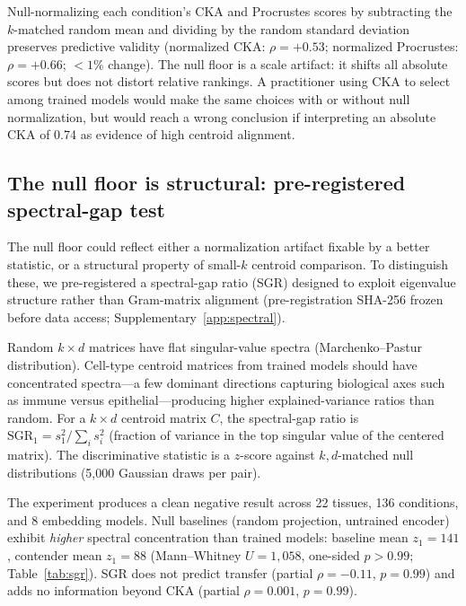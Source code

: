 \documentclass[11pt]{article}
\begin{document}
Null-normalizing each condition's CKA and Procrustes scores by
subtracting the $k$-matched random mean and dividing by the random
standard deviation preserves predictive validity (normalized CKA:
$\rho = +0.53$; normalized Procrustes: $\rho = +0.66$;
$< 1\%$ change). The null floor is a scale artifact: it shifts all
absolute scores but does not distort relative rankings. A practitioner
using CKA to select among trained models would make the same choices
with or without null normalization, but would reach a wrong conclusion
if interpreting an absolute CKA of 0.74 as evidence of high
centroid alignment.


\subsection{The null floor is structural: pre-registered spectral-gap test}
\label{sec:spectral}

The null floor could reflect either a normalization artifact fixable by
a better statistic, or a structural property of small-$k$ centroid
comparison. To distinguish these, we pre-registered a spectral-gap
ratio (SGR) designed to exploit eigenvalue structure rather than
Gram-matrix alignment (pre-registration SHA-256 frozen before data
access; Supplementary~\ref{app:spectral}).

Random $k \times d$ matrices have flat singular-value spectra
(Marchenko--Pastur distribution). Cell-type centroid matrices from
trained models should have concentrated spectra---a few dominant
directions capturing biological axes such as immune versus
epithelial---producing higher explained-variance ratios than random.
For a $k \times d$ centroid matrix $C$, the spectral-gap ratio is
$\mathrm{SGR}_1 = s_1^2 / \sum_i s_i^2$ (fraction of variance in the
top singular value of the centered matrix). The discriminative
statistic is a $z$-score against $k,d$-matched null distributions
(5,000 Gaussian draws per pair).

The experiment produces a clean negative result across 22 tissues,
136 conditions, and 8 embedding models. Null baselines (random
projection, untrained encoder) exhibit \emph{higher} spectral
concentration than trained models: baseline mean $z_1 = 141$,
contender mean $z_1 = 88$ (Mann--Whitney $U = 1{,}058$, one-sided
$p > 0.99$; Table~\ref{tab:sgr}). SGR does not predict transfer
(partial $\rho = -0.11$, $p = 0.99$) and adds no information beyond
CKA (partial $\rho = 0.001$, $p = 0.99$).
\end{document}
